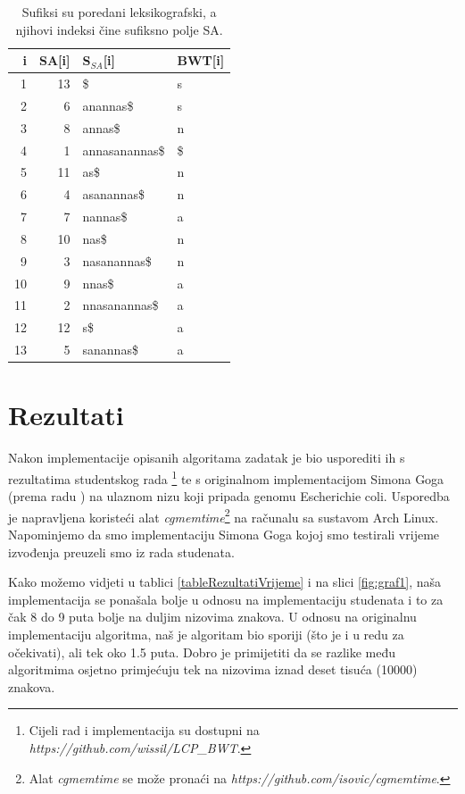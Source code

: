 \documentclass[times, utf8, seminar]{fer}
\begin{document}
\begin{table}
\caption{Sufiksi su poredani leksikografski, a njihovi indeksi čine sufiksno polje SA.}
\label{tablePrimjer2}
\begin{center}
\begin{tabular}{rrll}
\toprule
i & SA[i] & S$_{SA}$[i] & BWT[i] \\
\midrule
1 & 13 & \$ & s\\
2 & 6 &  anannas\$ & s \\
3 & 8 & annas\$ & n \\
4 & 1 & annasanannas\$ & \$ \\
5 & 11 & as\$ & n \\
6 & 4 & asanannas\$ & n \\
7 & 7 & nannas\$ & a\\
8 & 10 & nas\$ & n\\
9 & 3 & nasanannas\$ & n \\
10 & 9 & nnas\$ & a\\
11 & 2 & nnasanannas\$ & a \\
12 & 12 & s\$ & a\\
13 & 5 & sanannas\$ & a \\
\bottomrule
\end{tabular}

\end{center}

\end{table}



\chapter{Rezultati}

Nakon implementacije opisanih algoritama zadatak je bio usporediti ih s rezultatima studentskog rada \cite{studenti2016} \footnote{Cijeli rad i implementacija su dostupni na \textit{https://github.com/wissil/LCP\_BWT}.} te s originalnom implementacijom Simona Goga (prema radu \cite{beller2013}) na ulaznom nizu koji pripada genomu Escherichie coli. Usporedba je napravljena koristeći alat \textit{cgmemtime}\footnote{Alat \textit{cgmemtime} se može pronaći na \textit{https://github.com/isovic/cgmemtime}.} na računalu sa sustavom Arch Linux. Napominjemo da smo implementaciju Simona Goga kojoj smo testirali vrijeme izvođenja preuzeli smo iz rada studenata.

Kako možemo vidjeti u tablici \ref{tableRezultatiVrijeme} i na slici \ref{fig:graf1}, naša implementacija se ponašala bolje u odnosu na implementaciju studenata \cite{studenti2016} i to za čak 8 do 9 puta bolje na duljim nizovima znakova. U odnosu na originalnu implementaciju algoritma, naš je algoritam bio sporiji (što je i u redu za očekivati), ali tek oko 1.5 puta. Dobro je primijetiti da se razlike među algoritmima osjetno primjećuju tek na nizovima iznad deset tisuća (10000) znakova. 
\end{document}
